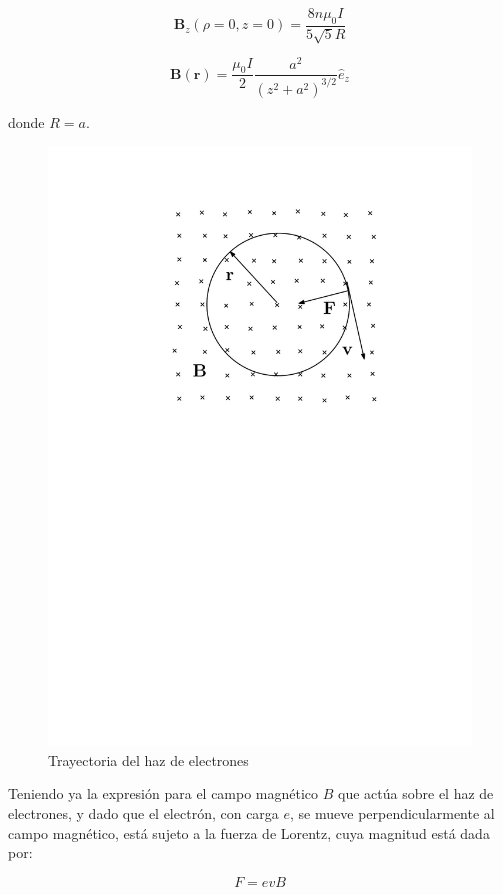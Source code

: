 \begin{equation}
  \mathbf{B}_{z}(\rho=0, z=0) = \frac{8 n \mu_{0} I}{5 \sqrt{5} R}
  \label{eq:Campo_magnetico_enHaz}
\end{equation}

\begin{equation}
  \mathbf{B}(\mathbf{r}) = \frac{\mu_{0}I}{2} \frac{a^{2}}{(z^{2}+a^{2})^{3/2}} \hat{e}_{z}
  \label{eq:Campo_magnetico_espira}
\end{equation}

donde \( R = a \).

\begin{figure}[H]
  \centering
  \includegraphics[width=0.8\linewidth]{./images/electron-path.pdf}
  \caption{Trayectoria del haz de electrones}
  \label{fig:haz_elelctrones}
\end{figure}

Teniendo ya la expresión para el campo magnético \( B \) que actúa sobre el haz de electrones, y dado que el electrón, con carga \( e \), se mueve perpendicularmente al campo magnético, está sujeto a la fuerza de Lorentz, cuya magnitud está dada por:

\begin{equation}
  F = e v B
  \label{eq:FuerzaLorentz}
\end{equation}

